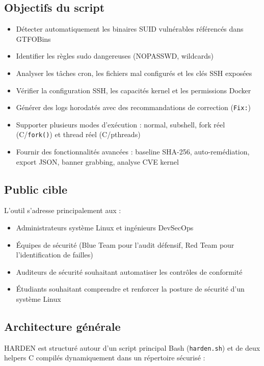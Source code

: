 \documentclass[12pt,a4paper]{article}
\newcommand{\cmd}[1]{\texttt{\textcolor{codeText}{#1}}}
\newcommand{\fichier}[1]{\texttt{\textcolor{bleuENSET}{#1}}}
\begin{document}
\subsection{Objectifs du script}

\begin{itemize}[topsep=2pt, itemsep=2pt]
  \item Détecter automatiquement les binaires SUID vulnérables référencés dans GTFOBins
  \item Identifier les règles sudo dangereuses (NOPASSWD, wildcards)
  \item Analyser les tâches cron, les fichiers mal configurés et les clés SSH exposées
  \item Vérifier la configuration SSH, les capacités kernel et les permissions Docker
  \item Générer des logs horodatés avec des recommandations de correction (\cmd{Fix:})
  \item Supporter plusieurs modes d'exécution : normal, subshell, fork réel (C/\cmd{fork()}) et thread réel (C/pthreads)
  \item Fournir des fonctionnalités avancées : baseline SHA-256, auto-remédiation, export JSON, banner grabbing, analyse CVE kernel
\end{itemize}

\subsection{Public cible}

L'outil s'adresse principalement aux :
\begin{itemize}[topsep=2pt, itemsep=2pt]
  \item Administrateurs système Linux et ingénieurs DevSecOps
  \item Équipes de sécurité (Blue Team pour l'audit défensif, Red Team pour l'identification de failles)
  \item Auditeurs de sécurité souhaitant automatiser les contrôles de conformité
  \item Étudiants souhaitant comprendre et renforcer la posture de sécurité d'un système Linux
\end{itemize}

\subsection{Architecture générale}

HARDEN est structuré autour d'un script principal Bash (\fichier{harden.sh}) et de deux helpers C compilés dynamiquement dans un répertoire sécurisé :
\end{document}
